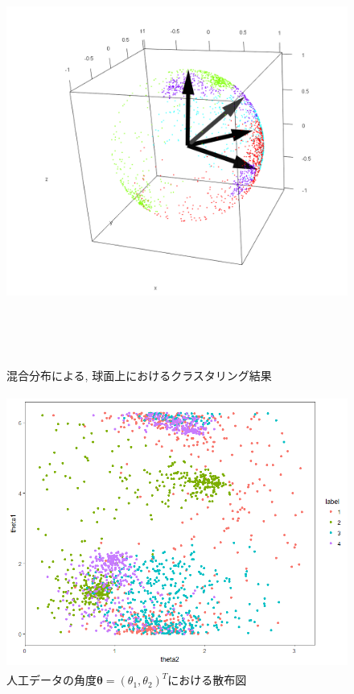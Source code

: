 \documentclass[a4j,12pt]{jarticle}
\begin{document}
\newpage %
\begin{figure}[tbp]
\begin{center}
\includegraphics[clip,height= 140mm]{data/cluster_3d_sim_pred.png}
\end{center}
\caption{混合分布による, 球面上におけるクラスタリング結果}
\label{clusterplot3d_sim}
\end{figure}

\clearpage
\begin{figure}[H]
\begin{center}
\includegraphics[clip,height= 90mm]{data/real.png}
\end{center}
\caption{人工データの角度$\bm \theta = (\theta_1, \theta_2)^T$における散布図}
\label{clusterplot2d_real}
\end{figure}
\end{document}
